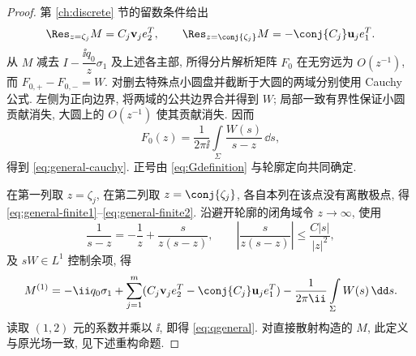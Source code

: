 \begin{proof}
第 \ref{ch:discrete} 节的留数条件给出
\[
\Res_{z=\zeta_j}M=C_j\mathbf v_je_2^T,\qquad
\Res_{z=\conj{\zeta_j}}M=-\conj{C_j}\mathbf u_je_1^T.
\]
从 $M$ 减去 $I-\dfrac{\ii q_0}{z}\sigma_1$ 及上述各主部, 所得分片解析矩阵 $F_0$ 在无穷远为 $O(z^{-1})$, 而 $F_{0,+}-F_{0,-}=W$. 对删去特殊点小圆盘并截断于大圆的两域分别使用 Cauchy 公式. 左侧为正向边界, 将两域的公共边界合并得到 $W$; 局部一致有界性保证小圆贡献消失, 大圆上的 $O(z^{-1})$ 使其贡献消失. 因而
\[
F_0(z)=\dfrac{1}{2\pi\ii}\int\limits_\Sigma\dfrac{W(s)}{s-z}\,\dd s,
\]
得到 \eqref{eq:general-cauchy}. 正号由 \eqref{eq:Gdefinition} 与轮廓定向共同确定.

在第一列取 $z=\zeta_j$, 在第二列取 $z=\conj{\zeta_j}$, 各自本列在该点没有离散极点, 得 \eqref{eq:general-finite1}--\eqref{eq:general-finite2}. 沿避开轮廓的闭角域令 $z\to\infty$, 使用
\[
\dfrac{1}{s-z}=-\dfrac{1}{z}+\dfrac{s}{z(s-z)},\qquad
\left|\dfrac{s}{z(s-z)}\right|\le\dfrac{C|s|}{|z|^2},
\]
及 $sW\in L^1$ 控制余项, 得
\begin{equation}\label{eq:M1-general}
M^{(1)}=-\ii q_0\sigma_1
+\sum\limits_{j=1}^{m}(C_j\mathbf v_je_2^T-\conj{C_j}\mathbf u_je_1^T)
-\dfrac{1}{2\pi\ii}\int\limits_\Sigma W(s)\,\dd s.
\end{equation}
读取 $(1,2)$ 元的系数并乘以 $\ii$, 即得 \eqref{eq:qgeneral}. 对直接散射构造的 $M$, 此定义与原光场一致, 见下述重构命题.
\end{proof}

